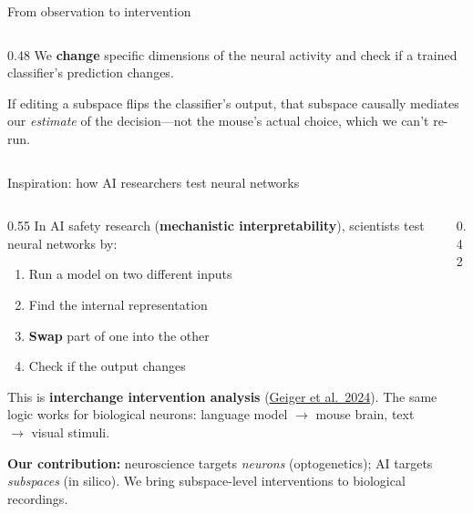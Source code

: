 \documentclass[aspectratio=169,11pt]{beamer}
\begin{document}
\begin{frame}{From observation to intervention}
\begin{columns}[T]
\begin{column}{0.48\textwidth}
\vspace{0.5em}
{\small We \textbf{change} specific dimensions of the neural activity and check if a trained classifier's prediction changes.}

\vspace{0.5em}
{\small If editing a subspace flips the classifier's output, that subspace causally mediates our \emph{estimate} of the decision---not the mouse's actual choice, which we can't re-run.}
\end{column}
\end{columns}
\end{frame}

\begin{frame}{Inspiration: how AI researchers test neural networks}
\begin{columns}[T]
\begin{column}{0.55\textwidth}
{\small In AI safety research (\textbf{mechanistic interpretability}), scientists test neural networks by:}

\begin{enumerate}\setlength\itemsep{0pt}
  \item {\small Run a model on two different inputs}
  \item {\small Find the internal representation}
  \item {\small \textbf{Swap} part of one into the other}
  \item {\small Check if the output changes}
\end{enumerate}

\vspace{0.1em}
{\small This is \textbf{interchange intervention analysis} (\href{https://arxiv.org/abs/2303.02536}{Geiger et al.\ 2024}). The same logic works for biological neurons: language model $\to$ mouse brain, text $\to$ visual stimuli.}

\vspace{0.2em}
{\scriptsize \textbf{Our contribution:} neuroscience targets \emph{neurons} (optogenetics); AI targets \emph{subspaces} (in silico). We bring subspace-level interventions to biological recordings.}
\end{column}
\begin{column}{0.42\textwidth}
\centering
{}
\end{column}
\end{columns}
\end{frame}
\end{document}
